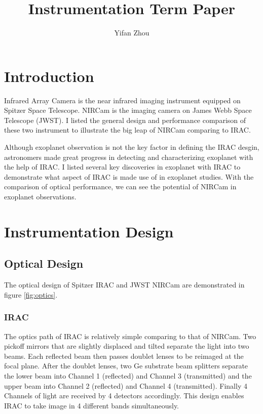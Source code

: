\documentclass[preprint, 12pt]{aastex}
\begin{document}
\title{Instrumentation Term Paper}
\author{Yifan Zhou}

\section{Introduction}
Infrared Array Camera is the near infrared imaging instrument equipped
on Spitzer Space Telescope. NIRCam is the imaging camera on James Webb
Space Telescope (JWST). I listed the general design and performance
comparison of these two instrument to illustrate the big leap of
NIRCam comparing to IRAC.

Although exoplanet observation is not the key factor in defining
the IRAC desgin, astronomers made great progress in detecting and
characterizing exoplanet with the help of IRAC. I listed several key
discoveries in exoplanet with IRAC to demonstrate what aspect of IRAC
is made use of in exoplanet studies. With the comparison of optical
performance, we can see the potential of NIRCam in exoplanet
observations. 

\section{Instrumentation Design}
\subsection{Optical Design}

The optical design of Spitzer IRAC and JWST NIRCam are demonstrated in
figure \ref{fig:optics}.\par

\subsubsection{IRAC}
The optics path of IRAC is relatively simple comparing to that of
NIRCam. Two pickoff mirrors that are slightly displaced and tilted
separate the light into two beams. Each reflected beam then passes
doublet lenses to be reimaged at the focal plane. After the doublet
lenses, two Ge substrate beam splitters separate the lower beam into
Channel 1 (reflected) and Channel 3 (transmitted) and the upper beam
into Channel 2 (reflected) and Channel 4 (transmitted). Finally 4
Channels of light are received by 4 detectors accordingly. This design
enables IRAC to take image in 4 different bands simultaneously.\par
\end{document}
